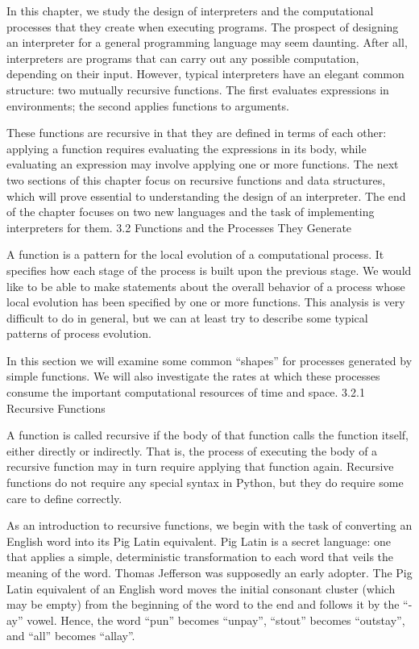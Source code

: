 \documentclass[letterpaper,10pt,dvipdfmx]{sphinxmanual}
\begin{document}
In this chapter, we study the design of interpreters and the computational processes that they create when executing programs. The prospect of designing an interpreter for a general programming language may seem daunting. After all, interpreters are programs that can carry out any possible computation, depending on their input. However, typical interpreters have an elegant common structure: two mutually recursive functions. The first evaluates expressions in environments; the second applies functions to arguments.

These functions are recursive in that they are defined in terms of each other: applying a function requires evaluating the expressions in its body, while evaluating an expression may involve applying one or more functions. The next two sections of this chapter focus on recursive functions and data structures, which will prove essential to understanding the design of an interpreter. The end of the chapter focuses on two new languages and the task of implementing interpreters for them.
3.2   Functions and the Processes They Generate

A function is a pattern for the local evolution of a computational process. It specifies how each stage of the process is built upon the previous stage. We would like to be able to make statements about the overall behavior of a process whose local evolution has been specified by one or more functions. This analysis is very difficult to do in general, but we can at least try to describe some typical patterns of process evolution.

In this section we will examine some common ``shapes'' for processes generated by simple functions. We will also investigate the rates at which these processes consume the important computational resources of time and space.
3.2.1   Recursive Functions

A function is called recursive if the body of that function calls the function itself, either directly or indirectly. That is, the process of executing the body of a recursive function may in turn require applying that function again. Recursive functions do not require any special syntax in Python, but they do require some care to define correctly.

As an introduction to recursive functions, we begin with the task of converting an English word into its Pig Latin equivalent. Pig Latin is a secret language: one that applies a simple, deterministic transformation to each word that veils the meaning of the word. Thomas Jefferson was supposedly an early adopter. The Pig Latin equivalent of an English word moves the initial consonant cluster (which may be empty) from the beginning of the word to the end and follows it by the ``-ay'' vowel. Hence, the word ``pun'' becomes ``unpay'', ``stout'' becomes ``outstay'', and ``all'' becomes ``allay''.
\end{document}
